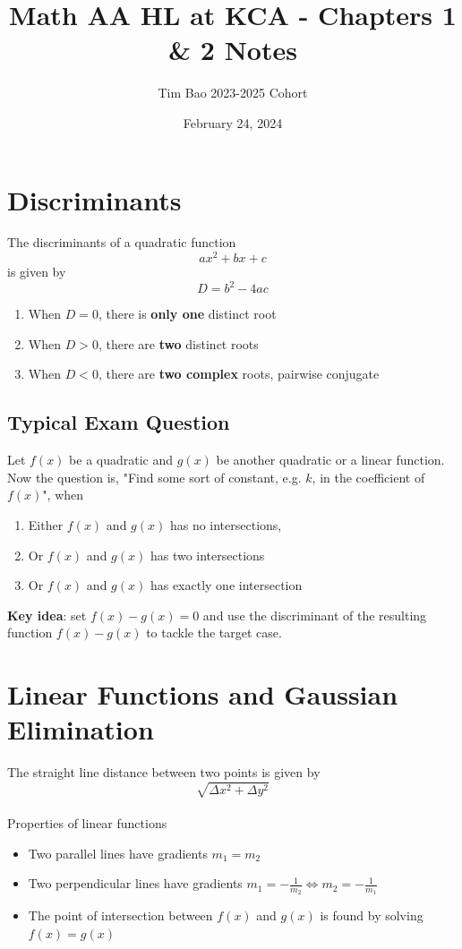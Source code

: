 \documentclass[11pt]{article}
\title{Math AA HL at KCA - Chapters 1 \& 2 Notes}
\author{Tim Bao 2023-2025 Cohort}
\date{February 24, 2024}
\newcommand{\lb}{\\[8pt]}
\begin{document}
\maketitle
\pagebreak

\section{Discriminants}

The discriminants of a quadratic function $$ax^2 + bx + c$$ is given by $$D = b^2 - 4ac$$
\begin{enumerate}
  \item When $D = 0$, there is \textbf{only one} distinct root
  \item When $D > 0$, there are \textbf{two} distinct roots
  \item When $D < 0$, there are \textbf{two complex} roots, pairwise conjugate
\end{enumerate}

\subsection*{Typical Exam Question}

Let $f(x)$ be a quadratic and $g(x)$ be another quadratic or a linear function. Now the question is, "Find some sort of constant, e.g. $k$, in the coefficient of $f(x)$", when

\begin{enumerate}
  \item Either $f(x)$ and $g(x)$ has no intersections,
  \item Or $f(x)$ and $g(x)$ has two intersections
  \item Or $f(x)$ and $g(x)$ has exactly one intersection
\end{enumerate}
\textbf{Key idea}: set $f(x) - g(x) = 0$ and use the discriminant of the resulting function $f(x) - g(x)$ to tackle the target case.

\pagebreak

\section{Linear Functions and Gaussian Elimination}

The straight line distance between two points is given by $$\sqrt{\Delta x^2 + \Delta y^2}$$\lb
Properties of linear functions
\begin{itemize}
  \item Two parallel lines have gradients $m_1 = m_2$
  \item Two perpendicular lines have gradients $m_1 = -\frac{1}{m_2} \iff m_2 = -\frac{1}{m_1}$
  \item The point of intersection between $f(x)$ and $g(x)$ is found by solving $f(x) = g(x)$
\end{itemize}
\end{document}
